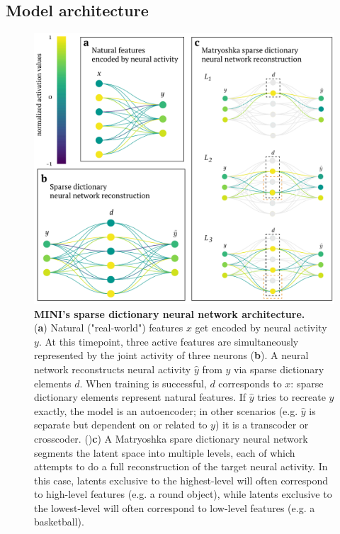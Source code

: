 \subsection{Model architecture}

\begin{figure}[t]
    \begin{minipage}{0.64\linewidth}
    \includegraphics[width=\linewidth]{figures/sdnn_arch.pdf}
    \end{minipage}%
    \begin{minipage}{0.35\linewidth}
    \caption{
        \textbf{MINI's sparse dictionary neural network architecture.} \\
        \small (\textbf{a}) Natural ("real-world") features $x$ get encoded by neural activity $y$. At this timepoint, three active features are simultaneously represented by the joint activity of three neurons (\textbf{b}). A neural network reconstructs neural activity $\hat{y}$ from $y$ via sparse dictionary elements $d$. When training is successful, $d$ corresponds to $x$: sparse dictionary elements represent natural features. If $\hat{y}$ tries to recreate $y$ exactly, the model is an autoencoder; in other scenarios (e.g. $\hat{y}$ is separate but dependent on or related to $y$) it is a transcoder or crosscoder. ()\textbf{c}) A Matryoshka spare dictionary neural network segments the latent space into multiple levels, each of which attempts to do a full reconstruction of the target neural activity. In this case, latents exclusive to the highest-level will often correspond to high-level features (e.g. a round object), while latents exclusive to the lowest-level will often correspond to low-level features (e.g. a basketball).
    }
    \label{fig:sdnn_arch}
    \end{minipage}
\end{figure}

